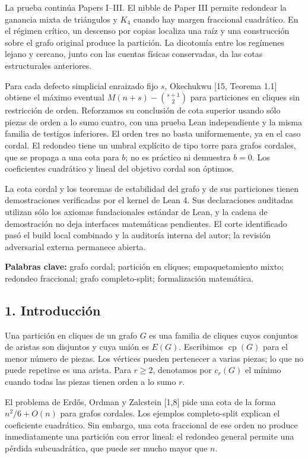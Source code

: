 \documentclass[spanish,11pt,a4paper]{article}
\begin{document}
La prueba continúa Papers I--III. El nibble de Paper III permite redondear la ganancia mixta de triángulos y \(K_4\) cuando hay margen fraccional cuadrático. En el régimen crítico, un descenso por copias localiza una raíz y una construcción sobre el grafo original produce la partición. La dicotomía entre los regímenes lejano y cercano, junto con las cuentas físicas conservadas, da las cotas estructurales anteriores.

Para cada defecto simplicial enraizado fijo \(s\), Okechukwu {[}15, Teorema 1.1{]} obtiene el máximo eventual \(M(n+s)-\binom{s+1}{2}\) para particiones en cliques sin restricción de orden. Reforzamos su conclusión de cota superior usando sólo piezas de orden a lo sumo cuatro, con una prueba Lean independiente y la misma familia de testigos inferiores. El orden tres no basta uniformemente, ya en el caso cordal. El redondeo tiene un umbral explícito de tipo torre para grafos cordales, que se propaga a una cota para \(b\); no es práctico ni demuestra \(b=0\). Los coeficientes cuadrático y lineal del objetivo cordal son óptimos.

La cota cordal y los teoremas de estabilidad del grafo y de sus particiones tienen demostraciones verificadas por el kernel de Lean 4. Sus declaraciones auditadas utilizan sólo los axiomas fundacionales estándar de Lean, y la cadena de demostración no deja interfaces matemáticas pendientes. El corte identificado pasó el build local combinado y la auditoría interna del autor; la revisión adversarial externa permanece abierta.

\textbf{Palabras clave:} grafo cordal; partición en cliques; empaquetamiento mixto; redondeo fraccional; grafo completo-split; formalización matemática.

\subsection{1. Introducción}\label{introduccion}

Una partición en cliques de un grafo \(G\) es una familia de cliques cuyos conjuntos de aristas son disjuntos y cuya unión es \(E(G)\). Escribimos \(\operatorname{cp}(G)\) para el menor número de piezas. Los vértices pueden pertenecer a varias piezas; lo que no puede repetirse es una arista. Para \(r\ge2\), denotamos por \(c_r(G)\) el mínimo cuando todas las piezas tienen orden a lo sumo \(r\).

El problema de Erdős, Ordman y Zalcstein {[}1,8{]} pide una cota de la forma \(n^2/6+O(n)\) para grafos cordales. Los ejemplos completo-split explican el coeficiente cuadrático. Sin embargo, una cota fraccional de ese orden no produce inmediatamente una partición con error lineal: el redondeo general permite una pérdida subcuadrática, que puede ser mucho mayor que \(n\).
\end{document}
